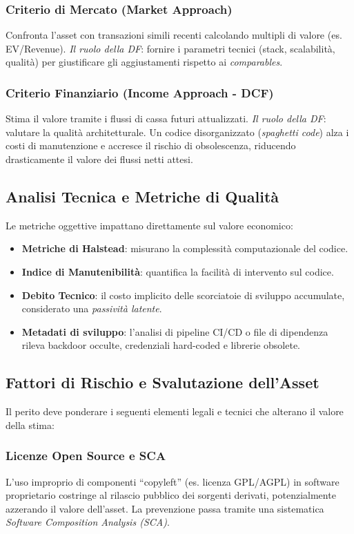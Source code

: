 \documentclass[11pt,a4paper]{article}
\begin{document}
\subsubsection{Criterio di Mercato (Market Approach)}
Confronta l'asset con transazioni simili recenti calcolando multipli di valore (es. EV/Revenue). 
\textit{Il ruolo della DF}: fornire i parametri tecnici (stack, scalabilità, qualità) per giustificare gli aggiustamenti rispetto ai \textit{comparables}.

\subsubsection{Criterio Finanziario (Income Approach - DCF)}
Stima il valore tramite i flussi di cassa futuri attualizzati.
\textit{Il ruolo della DF}: valutare la qualità architetturale. Un codice disorganizzato (\textit{spaghetti code}) alza i costi di manutenzione e accresce il rischio di obsolescenza, riducendo drasticamente il valore dei flussi netti attesi.

\subsection{Analisi Tecnica e Metriche di Qualità}
Le metriche oggettive impattano direttamente sul valore economico:
\begin{itemize}
    \item \textbf{Metriche di Halstead}: misurano la complessità computazionale del codice.
    \item \textbf{Indice di Manutenibilità}: quantifica la facilità di intervento sul codice.
    \item \textbf{Debito Tecnico}: il costo implicito delle scorciatoie di sviluppo accumulate, considerato una \textit{passività latente}.
    \item \textbf{Metadati di sviluppo}: l'analisi di pipeline CI/CD o file di dipendenza rileva backdoor occulte, credenziali hard-coded e librerie obsolete.
\end{itemize}

\subsection{Fattori di Rischio e Svalutazione dell'Asset}
Il perito deve ponderare i seguenti elementi legali e tecnici che alterano il valore della stima:

\subsubsection{Licenze Open Source e SCA}
L'uso improprio di componenti ``copyleft'' (es. licenza GPL/AGPL) in software proprietario costringe al rilascio pubblico dei sorgenti derivati, potenzialmente azzerando il valore dell'asset. La prevenzione passa tramite una sistematica \textit{Software Composition Analysis (SCA)}.
\end{document}
